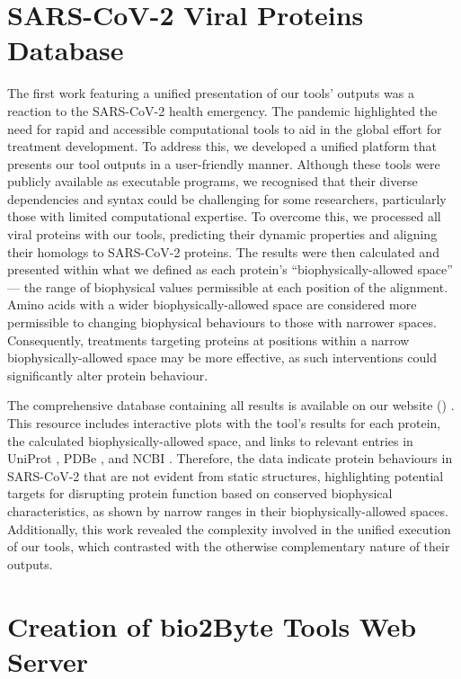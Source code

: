 \section{SARS-CoV-2 Viral Proteins Database}

The first work featuring a unified presentation of our tools' outputs was a reaction to the SARS-CoV-2 health emergency. The pandemic highlighted the need for rapid and accessible computational tools to aid in the global effort for treatment development. To address this, we developed a unified platform that presents our tool outputs in a user-friendly manner. Although these tools were publicly available as executable programs, we recognised that their diverse dependencies and syntax could be challenging for some researchers, particularly those with limited computational expertise. To overcome this, we processed all viral proteins with our tools, predicting their dynamic properties and aligning their homologs to SARS-CoV-2 proteins. The results were then calculated and presented within what we defined as each protein's ``biophysically-allowed space'' — the range of biophysical values permissible at each position of the alignment. Amino acids with a wider biophysically-allowed space are considered more permissible to changing biophysical behaviours to those with narrower spaces. Consequently, treatments targeting proteins at positions within a narrow biophysically-allowed space may be more effective, as such interventions could significantly alter protein behaviour.

The comprehensive database containing all results is available on our website () \cite{kagami_online_2021}. This resource includes interactive plots with the tool's results for each protein, the calculated biophysically-allowed space, and links to relevant entries in UniProt \cite{the_uniprot_consortium_uniprot_2023}, PDBe \cite{armstrong_pdbe_2020}, and NCBI \cite{sayers_database_2021}. Therefore, the data indicate protein behaviours in SARS-CoV-2 that are not evident from static structures, highlighting potential targets for disrupting protein function based on conserved biophysical characteristics, as shown by narrow ranges in their biophysically-allowed spaces. Additionally, this work revealed the complexity involved in the unified execution of our tools, which contrasted with the otherwise complementary nature of their outputs.

\section{Creation of bio2Byte Tools Web Server}

